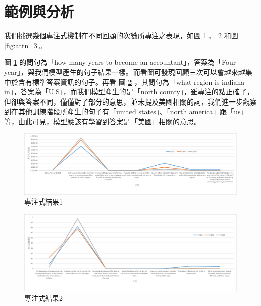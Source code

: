 \section{範例與分析}
我們挑選幾個專注式機制在不同回顧的次數所專注之表現，如圖 \ref{fig:attn_1} 、 \ref{fig:attn_2} 和圖 \ref{fig:attn_3}。

圖 \ref{fig:attn_1} 的問句為「how many years to become an accountant」，答案為「Four year」，與我們模型產生的句子結果一樣。而看圖可發現回顧三次可以會越來越集中於含有標準答案資訊的句子。再看
圖 \ref{fig:attn_2} ，其問句為「what region is indiana in」，答案為「U.S」，而我們模型產生的是「north county」，雖專注的點正確了，但卻與答案不同，僅僅對了部分的意思，並未提及美國相關的詞，我們進一步觀察到在其他訓練階段所產生的句子有「united states」、「north america」跟「us」等，由此可見，模型應該有學習到答案是「美國」相關的意思。
\begin{figure}
    \centering
    \includegraphics[scale=0.6,angle=90]{images/chap3_attn1.png}
    \caption{專注式結果1}\label{fig:attn_1}
\end{figure}
\begin{figure}
    \centering
    \includegraphics[scale=0.65,angle=90]{images/chap3_attn2.png}
    \caption{專注式結果2}\label{fig:attn_2}
\end{figure}

